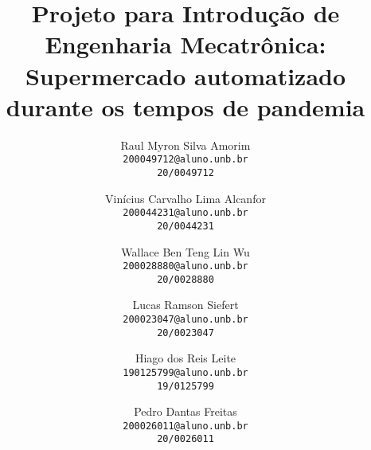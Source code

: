 \documentclass[10pt,twocolumn,letterpaper]{article}
\begin{document}
\title{Projeto para Introdução de Engenharia Mecatrônica: Supermercado automatizado durante os tempos de pandemia}

\author{Raul Myron Silva Amorim\\
{\tt\small 200049712@aluno.unb.br}\\
{\tt\small 20/0049712}
\and
Vinícius Carvalho Lima Alcanfor\\
{\tt\small 200044231@aluno.unb.br}\\
{\tt\small 20/0044231}
\and
Wallace Ben Teng Lin Wu\\
{\tt\small 200028880@aluno.unb.br}\\
{\tt\small 20/0028880}
\and
Lucas Ramson Siefert\\
{\tt\small 200023047@aluno.unb.br}\\
{\tt\small 20/0023047}
\and
Hiago dos Reis Leite\\
{\tt\small  190125799@aluno.unb.br}\\
{\tt\small 19/0125799}
\and
Pedro Dantas Freitas\\
{\tt\small 200026011@aluno.unb.br}\\
{\tt\small 20/0026011}
}

\maketitle
\end{document}
